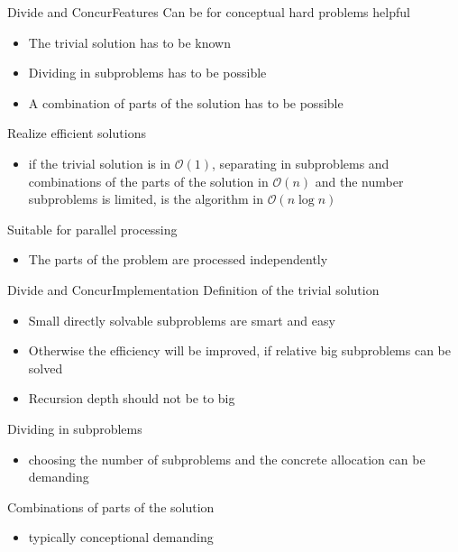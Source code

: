 
\begin{frame}{Divide and Concur}{Features}
	Can be for conceptual hard problems helpful
	\begin{itemize}
		\item
			The trivial solution has to be known
		\item
			Dividing in subproblems has to be possible
		\item
			A combination of parts of the solution has to be possible 
	\end{itemize}
	Realize efficient solutions
	\begin{itemize}
		\item
			if the trivial solution is in $\mathcal{O}(1)$, separating in subproblems 
			and combinations of the parts of the solution in $\mathcal{O}(n)$ and the 
			number subproblems is limited, is the algorithm in $\mathcal{O}(n \log n)$
	\end{itemize}
	Suitable for parallel processing
	\begin{itemize}
		\item
			The parts of the problem are processed independently
	\end{itemize}
\end{frame}


\begin{frame}{Divide and Concur}{Implementation}
	Definition of the trivial solution
	\begin{itemize}
		\item
			Small directly solvable subproblems are smart and easy
		\item
			Otherwise the efficiency will be improved, if relative big subproblems 
			can be solved
		\item
			Recursion depth should not be to big
	\end{itemize}
	Dividing in subproblems
	\begin{itemize}
		\item
			choosing the number of subproblems and the concrete allocation  can be 
			demanding
	\end{itemize}
	Combinations of parts of the solution
	\begin{itemize}
		\item
			typically conceptional demanding
	\end{itemize}
\end{frame}

